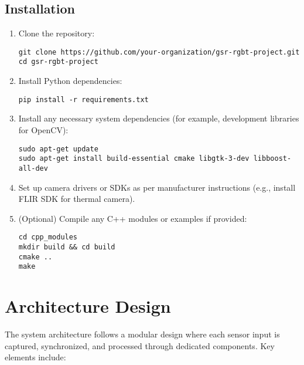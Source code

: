 \documentclass{article}
\begin{document}
    \subsection{Installation}

    \begin{enumerate}
        \item Clone the repository:
        \begin{verbatim}
git clone https://github.com/your-organization/gsr-rgbt-project.git
cd gsr-rgbt-project
        \end{verbatim}
        \item Install Python dependencies:
        \begin{verbatim}
pip install -r requirements.txt
        \end{verbatim}
        \item Install any necessary system dependencies (for example, development libraries for OpenCV):
        \begin{verbatim}
sudo apt-get update
sudo apt-get install build-essential cmake libgtk-3-dev libboost-all-dev
        \end{verbatim}
        \item Set up camera drivers or SDKs as per manufacturer instructions (e.g., install FLIR SDK for thermal camera).
        \item (Optional) Compile any C++ modules or examples if provided:
        \begin{verbatim}
cd cpp_modules
mkdir build && cd build
cmake ..
make
        \end{verbatim}
    \end{enumerate}


    \section{Architecture Design}

    The system architecture follows a modular design where each sensor input is captured, synchronized, and processed through dedicated components. Key elements include:
\end{document}
